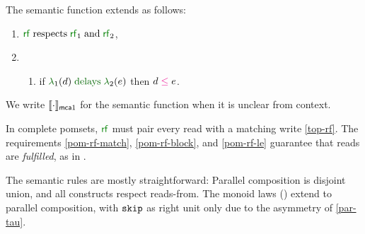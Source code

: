 \begin{definition}
  \noindent
  The semantic function extends  as follows:
  \begin{multicols}{2}
    \begin{enumerate}[topsep=0pt,label=(\textsc{i}\arabic*),ref=\textsc{i}\arabic*]
    \item[{\labeltext[\textsc{p}7]{(\textsc{p}7)}{par-rf}}]
      \;
      \;
      ${\rrfx}\rextends{\rrfx_1}{\rrfx_2}$,
      \setcounter{enumi}{\value{le}}
    \item[]
      \begin{enumerate}[leftmargin=0pt]
      \item \label{seq-le-delays}
        if $\labeling_1(\bEv) \rdelays \labeling_2(\aEv)$ then $\bEv\le\aEv$.
      \end{enumerate}
    \end{enumerate}  
  \end{multicols}
\end{definition}
We write $\semmca{1}{}$ for the semantic function when it is unclear from context.

In complete pomsets, $\rrfx$ must pair every read with a matching write
\eqref{top-rf}.  The requirements \ref{pom-rf-match}, \ref{pom-rf-block}, and
\ref{pom-rf-le} guarantee that reads are \emph{fulfilled}, as in
\cite[]{DBLP:journals/pacmpl/JagadeesanJR20}.

The semantic rules are mostly straightforward: Parallel composition is disjoint
union, and all constructs respect reads-from.  The monoid laws
() extend to parallel composition, with $\texttt{skip}$ as right
unit only due to the asymmetry of \ref{par-tau}.

